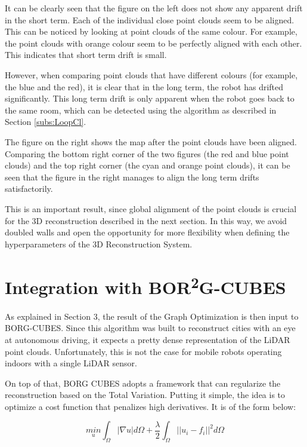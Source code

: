 \documentclass[12pt]{article}
\begin{document}
It can be clearly seen that the figure on the left does not show any apparent drift in the short term. Each of the individual close point clouds seem to be aligned. This can be noticed by looking at point clouds of the same colour. For example, the point clouds with orange colour seem to be perfectly aligned with each other. This indicates that short term drift is small.
	
However, when comparing point clouds that have different colours (for example, the blue and the red), it is clear that in the long term, the robot has drifted significantly. This long term drift is only apparent when the robot goes back to the same room, which can be detected using the algorithm as described in Section \ref{subs:LoopCl}.
	
The figure on the right shows the map after the point clouds have been aligned. Comparing the bottom right corner of the two figures (the red and blue point clouds) and the top right corner (the cyan and orange point clouds), it can be seen that the figure in the right manages to align the long term drifts satisfactorily.
	
This is an important result, since global alignment of the point clouds is crucial for the 3D reconstruction described in the next section. In this way, we avoid doubled walls and open the opportunity for more flexibility when defining the hyperparameters of the 3D Reconstruction System.
	
	\newpage
	\section{Integration with BOR\textsuperscript{2}G-CUBES}
	\label{sec:Borg}
	
As explained in Section 3, the result of the Graph Optimization is then input to BORG-CUBES. Since this algorithm was built to reconstruct cities with an eye at autonomous driving, it expects a pretty dense representation of the LiDAR point clouds. Unfortunately, this is not the case for mobile robots operating indoors with a single LiDAR sensor.
	
On top of that, BORG CUBES adopts a framework that can regularize the reconstruction based on the Total Variation. Putting it simple, the idea is to optimize a cost function that penalizes high derivatives. It is of the form below:


\begin{equation}
\underset{u}{min} \int_{\Omega } | \nabla u| d \Omega + \frac{\lambda}{2} \int_{\Omega}||u_i - f_i||^2 d \Omega
\label{eq:Regularizer}
\end{equation}
\end{document}
